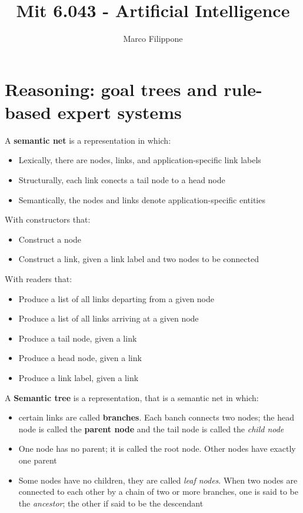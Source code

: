 \documentclass{article}
\begin{document}
\title{Mit 6.043 - Artificial Intelligence}
\author{Marco Filippone}
\maketitle

\section{Reasoning: goal trees and rule-based expert systems}

A \textbf{semantic net} is a representation in which:
\begin{itemize}
  \item Lexically, there are nodes, links, and application-specific link labels
  \item Structurally, each link conects a tail node to a head node
  \item Semantically, the nodes and links denote application-specific entities
\end{itemize}
With constructors that:
\begin{itemize}
  \item Construct a node
  \item Construct a link, given a link label and two nodes to be connected
\end{itemize}
With readers that:
\begin{itemize}
  \item Produce a list of all links departing from a given node
  \item Produce a list of all links arriving at a given node
  \item Produce a tail node, given a link
  \item Produce a head node, given a link
  \item Produce a link label, given a link
\end{itemize}

A \textbf{Semantic tree} is a representation, that is a semantic net in which:
\begin{itemize}
  \item certain links are called \textbf{branches}. Each banch
    connects two nodes; the head node is called the \textbf{parent
    node} and the tail node is called the \textit{child node}
  \item One node has no parent; it is called the root node.
    Other nodes have exactly one parent
  \item Some nodes have no children, they are called
    \textit{leaf nodes}. When two nodes are connected to each
    other by a chain of two or more branches, one is said to be
    the \textit{ancestor}; the other if said to be the
    descendant
\end{itemize}
\end{document}
